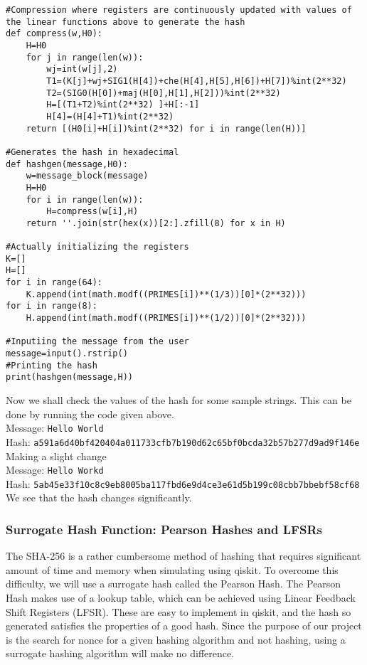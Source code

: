 \begin{lstlisting}
#Compression where registers are continuously updated with values of the linear functions above to generate the hash
def compress(w,H0):
    H=H0
    for j in range(len(w)):
        wj=int(w[j],2)
        T1=(K[j]+wj+SIG1(H[4])+che(H[4],H[5],H[6])+H[7])%int(2**32)
        T2=(SIG0(H[0])+maj(H[0],H[1],H[2]))%int(2**32)  
        H=[(T1+T2)%int(2**32) ]+H[:-1]
        H[4]=(H[4]+T1)%int(2**32)
    return [(H0[i]+H[i])%int(2**32) for i in range(len(H))]

#Generates the hash in hexadecimal
def hashgen(message,H0):
    w=message_block(message)
    H=H0
    for i in range(len(w)):
        H=compress(w[i],H)
    return ''.join(str(hex(x))[2:].zfill(8) for x in H)

#Actually initializing the registers
K=[]
H=[]
for i in range(64):
    K.append(int(math.modf((PRIMES[i])**(1/3))[0]*(2**32)))
for i in range(8):
    H.append(int(math.modf((PRIMES[i])**(1/2))[0]*(2**32)))

#Inputiing the message from the user
message=input().rstrip()
#Printing the hash
print(hashgen(message,H))
\end{lstlisting}
Now we shall check the values of the hash for some sample strings. This can be done by running the code given above.\\
Message: \verb|Hello World|\\
Hash: \verb|a591a6d40bf420404a011733cfb7b190d62c65bf0bcda32b57b277d9ad9f146e|\\
Making a slight change\\
Message: \verb|Hello Workd|\\
Hash: \verb|5ab45e33f10c8c9eb8005ba117fbd6e9d4ce3e61d5b199c08cbb7bbebf58cf68|\\
We see that the hash changes significantly.
\subsubsection*{Surrogate Hash Function: Pearson Hashes and LFSRs}
The SHA-256 is a rather cumbersome method of hashing that requires significant amount of time and memory when simulating using qiskit. To overcome this difficulty, we will use a surrogate hash called the Pearson Hash\cite{pearson}. The Pearson Hash makes use of a lookup table, which can be achieved using Linear Feedback Shift Registers (LFSR)\cite{lfsr}. These are easy to implement in qiskit\cite{qlfsr}, and the hash so generated satisfies the properties of a good hash. Since the purpose of our project is the search for nonce for a given hashing algorithm and not hashing, using a surrogate hashing algorithm will make no difference.

